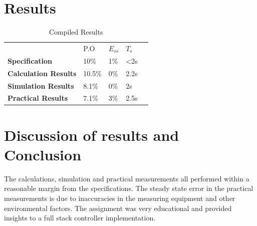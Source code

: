 \chapter{Results}
\begin{table}[h]
\centering
\caption{Compiled Results}
\begin{tabular}{|l|l|l|l|l}
\cline{1-4}
                             & P.O    & $E_{ss}$ & $T_s$       &  \\ \cline{1-4}
\textbf{Specification}       & 10\%   & 1\%      & \textless2s &  \\ \cline{1-4}
\textbf{Calculation Results} & 10.5\% & 0\%      & 2.2s        &  \\ \cline{1-4}
\textbf{Simulation Results}  & 8.1\%  & 0\%      & 2s          &  \\ \cline{1-4}
\textbf{Practical Results}   & 7.1\%  & 3\%      & 2.5s        &  \\ \cline{1-4}
\end{tabular}


\end{table}

\chapter{Discussion of results and Conclusion}
The calculations, simulation and practical measurements all performed within a reasonable margin from the specifications. The steady state error in the practical measurements is due to inaccuracies in the measuring equipment and other environmental factors. The assignment was very educational and provided insights to a full stack controller implementation.



